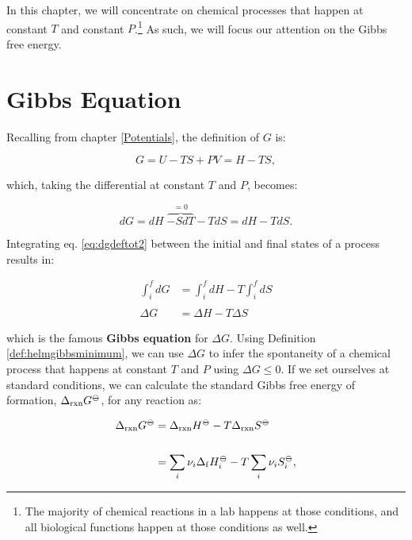 \documentclass[
  9pt,
]{extbook}
\theoremstyle{definition}
\theoremstyle{definition}
\theoremstyle{definition}
\theoremstyle{definition}
\theoremstyle{remark}
\begin{document}
In this chapter, we will concentrate on chemical processes that happen at constant \(T\) and constant \(P\).\footnote{The majority of chemical reactions in a lab happens at those conditions, and all biological functions happen at those conditions as well.} As such, we will focus our attention on the Gibbs free energy.

\section{Gibbs Equation}\label{gibbseqsec}

Recalling from chapter \ref{Potentials}, the definition of \(G\) is:

\begin{equation}
G = U -TS +PV = H-TS,
\label{eq:dgdeftot}
\end{equation}

which, taking the differential at constant \(T\) and \(P\), becomes:

\begin{equation}
dG = dH \; \overbrace{-SdT}^{=0} -TdS = dH -TdS.
\label{eq:dgdeftot2}
\end{equation}

Integrating eq. \eqref{eq:dgdeftot2} between the initial and final states of a process results in:

\begin{equation}
\begin{aligned}
\int_i^f dG &= \int_i^f dH -T \int_i^f dS \\
\\
\Delta G &= \Delta H -T \Delta S
\end{aligned}
\label{eq:gibbseq}
\end{equation}

which is the famous \textbf{Gibbs equation} for \(\Delta G\). Using Definition \ref{def:helmgibbsminimum}, we can use \(\Delta G\) to infer the spontaneity of a chemical process that happens at constant \(T\) and \(P\) using \(\Delta G \leq 0\). If we set ourselves at standard conditions, we can calculate the standard Gibbs free energy of formation, \(\Delta_{\text{rxn}} G^{-\kern-6pt{\ominus}\kern-6pt-}\), for any reaction as:

\begin{equation}
\begin{aligned}
\Delta_{\text{rxn}} G^{-\kern-6pt{\ominus}\kern-6pt-}&= \Delta_{\text{rxn}} H^{-\kern-6pt{\ominus}\kern-6pt-}-T \Delta_{\text{rxn}} S^{-\kern-6pt{\ominus}\kern-6pt-}\\
\\
&= \sum_i \nu_i \Delta_{\mathrm{f}} H_i^{-\kern-6pt{\ominus}\kern-6pt-}- T \sum_i \nu_i S_i^{-\kern-6pt{\ominus}\kern-6pt-},
\end{aligned}
\label{eq:gibbseq2}
\end{equation}
\end{document}
